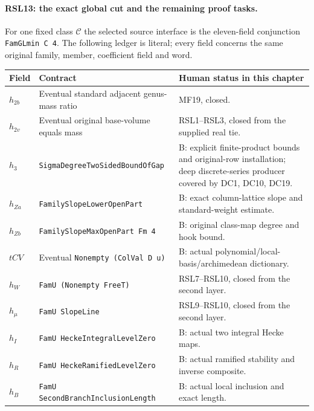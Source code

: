 \paragraph{RSL13: the exact global cut and the remaining proof tasks.}
\label{claim:RSL13}
For one fixed class $\mathcal C$ the selected source interface
is the eleven-field conjunction \texttt{FamGLmin C 4}.
The following ledger is literal; every field concerns the
same original family, member, coefficient field and word.
\begin{center}
\begin{tabular}{p{}p{}p{}}
\hline
Field & Contract & Human status in this chapter \\
\hline
$h_{2b}$ & Eventual standard adjacent genus-mass ratio & MF19, closed. \\
$h_{2v}$ & Eventual original base-volume equals mass & RSL1--RSL3, closed from the supplied real tie. \\
$h_3$ & \texttt{SigmaDegreeTwoSidedBoundOfGap} & B: explicit finite-product bounds and original-row installation; deep discrete-series producer covered by DC1, DC10, DC19. \\
$h_{Za}$ & \texttt{FamilySlopeLowerOpenPart} & B: exact column-lattice slope and standard-weight estimate. \\
$h_{Zb}$ & \texttt{FamilySlopeMaxOpenPart Fm 4} & B: original class-map degree and hook bound. \\
$tCV$ & Eventual \texttt{Nonempty (ColVal D u)} & B: actual polynomial/local-basis/archimedean dictionary. \\
$h_W$ & \texttt{FamU (Nonempty FreeT)} & RSL7--RSL10, closed from the second layer. \\
$h_\mu$ & \texttt{FamU SlopeLine} & RSL9--RSL10, closed from the second layer. \\
$h_I$ & \texttt{FamU HeckeIntegralLevelZero} & B: actual two integral Hecke maps. \\
$h_R$ & \texttt{FamU HeckeRamifiedLevelZero} & B: actual ramified stability and inverse composite. \\
$h_B$ & \texttt{FamU SecondBranchInclusionLength} & B: actual local inclusion and exact length. \\
\hline
\end{tabular}
\end{center}

